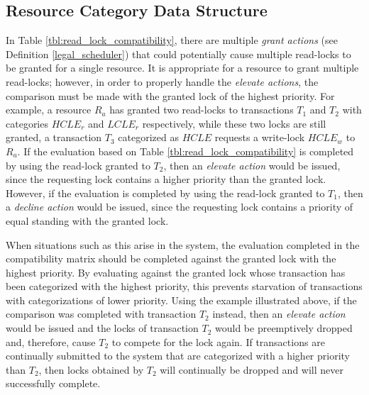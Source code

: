 \subsection{Resource Category Data Structure}
\label{pbs:RCDS}

In Table \ref{tbl:read_lock_compatibility}, there are multiple \textit{grant actions} (see Definition \ref{legal_scheduler}) that could potentially cause multiple read-locks to be granted for a single resource. It is appropriate for a resource to grant multiple read-locks; however, in order to properly handle the \textit{elevate actions}, the comparison must be made with the granted lock of the highest priority. For example, a resource $R_{a}$ has granted two read-locks to transactions $T_{1}$ and $T_{2}$ with categories $HCLE_{r}$ and $LCLE_{r}$ respectively, while these two locks are still granted, a transaction $T_{3}$ categorized as $HCLE$ requests a write-lock $HCLE_{w}$ to $R_{a}$. If the evaluation based on Table \ref{tbl:read_lock_compatibility} is completed by using the read-lock granted to $T_{2}$, then an \textit{elevate action} would be issued, since the requesting lock contains a higher priority than the granted lock. However, if the evaluation is completed by using the read-lock granted to $T_{1}$, then a \textit{decline action} would be issued, since the requesting lock contains a priority of equal standing with the granted lock.

When situations such as this arise in the system, the evaluation completed in the compatibility matrix should be completed against the granted lock with the highest priority. By evaluating against the granted lock whose transaction has been categorized with the highest priority, this prevents starvation of transactions with categorizations of lower priority. Using the example illustrated above, if the comparison was completed with transaction $T_{2}$ instead, then an \textit{elevate action} would be issued and the locks of transaction $T_{2}$ would be preemptively dropped and, therefore, cause $T_{2}$ to compete for the lock again. If transactions are continually submitted to the system that are categorized with a higher priority than $T_{2}$, then locks obtained by $T_{2}$ will continually be dropped and will never successfully complete.

